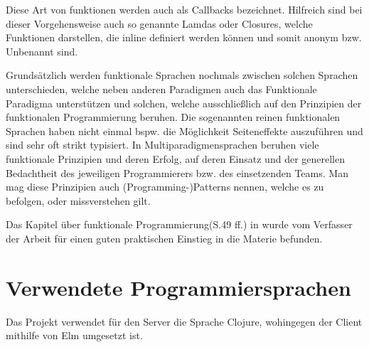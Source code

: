 Diese Art von funktionen werden auch als Callbacks bezeichnet.
Hilfreich sind bei dieser Vorgehensweise auch so genannte Lamdas oder Closures, welche Funktionen darstellen, die inline definiert werden können und somit anonym \ac{bzw.} Unbenannt sind.
\par
Grundsätzlich werden funktionale Sprachen nochmals zwischen solchen Sprachen unterschieden, welche neben anderen Paradigmen auch das Funktionale Paradigma unterstützen und solchen, welche ausschließlich auf den Prinzipien der funktionalen Programmierung beruhen.
Die sogenannten reinen funktionalen Sprachen haben nicht einmal \ac{bspw.} die Möglichkeit Seiteneffekte auszuführen und sind sehr oft strikt typisiert.
In Multiparadigmensprachen beruhen viele funktionale Prinzipien und deren Erfolg, auf deren Einsatz und der generellen Bedachtheit des jeweiligen Programmierers \ac{bzw.} des einsetzenden Teams.
Man mag diese Prinzipien auch (Programming-)Patterns nennen, welche es zu befolgen, oder missverstehen gilt.
\par
Das Kapitel über funktionale Programmierung(S.49 ff.) in \cite{Butcher:2014:SCM:2621977} wurde vom Verfasser der Arbeit für einen guten praktischen Einstieg in die Materie befunden.

\section{Verwendete Programmiersprachen}
Das Projekt verwendet für den Server die Sprache Clojure, wohingegen der Client mithilfe von Elm umgesetzt ist.

